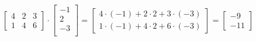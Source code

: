 \documentclass[a4paper,12pt]{scrartcl}
\begin{document}
\begin{enumerate}[a)]
\begin{equation*}
\left[\begin{array}{ccc} 4 & 2 & 3 \\ 1 &4 & 6 \end{array}\right] \cdot \begin{bmatrix}
-1 \\
2 \\
-3\\
\end{bmatrix}
=  
\begin{bmatrix}
4\cdot (-1) + 2\cdot 2 + 3\cdot (-3)\\
1\cdot (-1) + 4 \cdot 2 + 6\cdot (-3)
\end{bmatrix}
= 
\begin{bmatrix}
-9 \\ -11
\end{bmatrix}
\end{equation*}


\end{enumerate}
\end{document}

